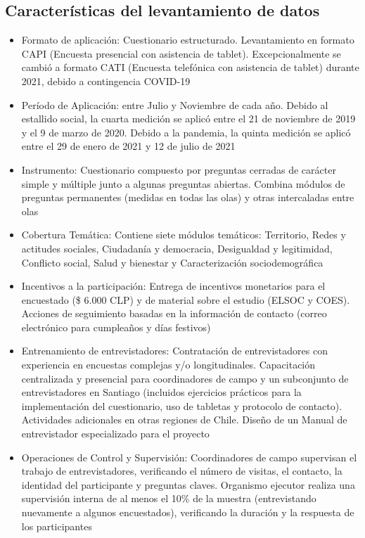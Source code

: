 \documentclass[
  12pt,
]{book}
\begin{document}
\hypertarget{caracteruxedsticas-del-levantamiento-de-datos}{%
\subsection{Características del levantamiento de datos}\label{caracteruxedsticas-del-levantamiento-de-datos}}

\begin{itemize}
\item
  Formato de aplicación: Cuestionario estructurado. Levantamiento en formato CAPI (Encuesta presencial con asistencia de tablet). Excepcionalmente se cambió a formato CATI (Encuesta telefónica con asistencia de tablet) durante 2021, debido a contingencia COVID-19
\item
  Período de Aplicación: entre Julio y Noviembre de cada año. Debido al estallido social, la cuarta medición se aplicó entre el 21 de noviembre de 2019 y el 9 de marzo de 2020. Debido a la pandemia, la quinta medición se aplicó entre el 29 de enero de 2021 y 12 de julio de 2021
\item
  Instrumento: Cuestionario compuesto por preguntas cerradas de carácter simple y múltiple junto a algunas preguntas abiertas. Combina módulos de preguntas permanentes (medidas en todas las olas) y otras intercaladas entre olas
\item
  Cobertura Temática: Contiene siete módulos temáticos: Territorio, Redes y actitudes sociales, Ciudadanía y democracia, Desigualdad y legitimidad, Conflicto social, Salud y bienestar y Caracterización sociodemográfica
\item
  Incentivos a la participación: Entrega de incentivos monetarios para el encuestado (\$ 6.000 CLP) y de material sobre el estudio (ELSOC y COES). Acciones de seguimiento basadas en la información de contacto (correo electrónico para cumpleaños y días festivos)
\item
  Entrenamiento de entrevistadores: Contratación de entrevistadores con experiencia en encuestas complejas y/o longitudinales. Capacitación centralizada y presencial para coordinadores de campo y un subconjunto de entrevistadores en Santiago (incluidos ejercicios prácticos para la implementación del cuestionario, uso de tabletas y protocolo de contacto). Actividades adicionales en otras regiones de Chile. Diseño de un Manual de entrevistador especializado para el proyecto
\item
  Operaciones de Control y Supervisión: Coordinadores de campo supervisan el trabajo de entrevistadores, verificando el número de visitas, el contacto, la identidad del participante y preguntas claves. Organismo ejecutor realiza una supervisión interna de al menos el 10\% de la muestra (entrevistando nuevamente a algunos encuestados), verificando la duración y la respuesta de los participantes
\end{itemize}
\end{document}
